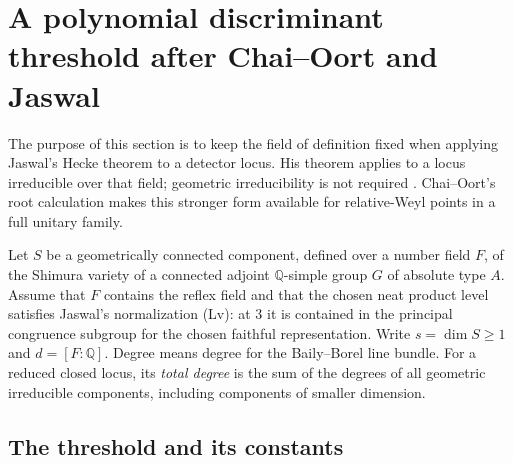 \documentclass[11pt]{article}
\theoremstyle{definition}
\theoremstyle{remark}
\begin{document}
\section{A polynomial discriminant threshold after Chai--Oort and Jaswal}
\label{sec:polynomial-threshold}

The purpose of this section is to keep the field of definition fixed when
applying Jaswal's Hecke theorem to a detector locus.  His theorem applies
to a locus irreducible over that field; geometric irreducibility is not
required \cite[Theorem~6.7]{Jaswal}.  Chai--Oort's root calculation makes
this stronger form available for relative-Weyl points in a full unitary
family.

Let $S$ be a geometrically connected component, defined over a number
field $F$, of the Shimura variety of a connected adjoint
$\mathbb Q$-simple group $G$ of absolute type $A$.  Assume that $F$
contains the reflex field and that the chosen neat product level
satisfies Jaswal's normalization (Lv): at $3$ it is contained in the
principal congruence subgroup for the chosen faithful representation.
Write $s=\dim S\geq1$ and $d=[F:\mathbb Q]$.  Degree means degree for
the Baily--Borel line bundle.  For a reduced closed locus, its
\emph{total degree} is the sum of the degrees of all geometric
irreducible components, including components of smaller dimension.


\subsection{The threshold and its constants}
\end{document}
